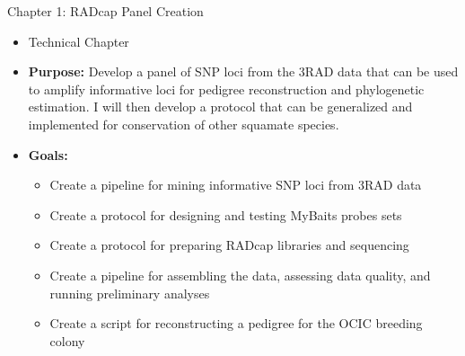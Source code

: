 \documentclass[10pt,aspectratio=169]{beamer}
\begin{document}
\begin{frame}{Chapter 1: RADcap Panel Creation}
  \begin{itemize}
      \item Technical Chapter
      \item \textbf{Purpose:} Develop a panel of SNP loci from the 3RAD data that can be used to amplify informative loci for pedigree reconstruction and phylogenetic estimation. I will then develop a protocol that can be generalized and implemented for conservation of other squamate species. 

      \item \textbf{Goals:}
      \begin{itemize}
        \item Create a pipeline for mining informative SNP loci from 3RAD data
        \item Create a protocol for designing and testing MyBaits probes sets 
        \item Create a protocol for preparing RADcap libraries and sequencing 
        \item Create a pipeline for assembling the data, assessing data quality, and running preliminary analyses
        \item Create a script for reconstructing a pedigree for the OCIC breeding colony
      \end{itemize}
  \end{itemize}
\end{frame}
\end{document}
